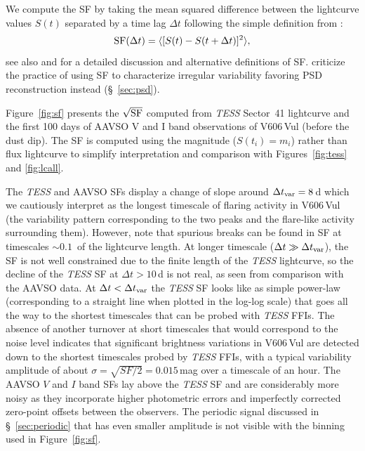 \documentclass[twocolumn]{aastex631}
\newcommand{\nova}{V606\,Vul}
\begin{document}
We compute the SF by taking the mean squared difference between the lightcurve values $S(t)$ 
separated by a time lag $\Delta t$ following the simple definition from \cite{1992ApJ...396..469H}:
\begin{equation}
{\rm SF}(\Delta t) = \langle[S(t) - S(t + \Delta t)]^2\rangle,
\label{eq:sf}
\end{equation}
see also \cite{2016ApJ...826..118K} and \cite{2014MNRAS.439..703G} for a detailed discussion and 
alternative definitions of SF. \cite{2010MNRAS.404..931E} criticize the
practice of using SF to characterize irregular variability favoring PSD
reconstruction instead (\S~\ref{sec:psd}).

Figure~\ref{fig:sf} presents the $\sqrt{{\rm SF}}$ computed from {\em TESS} Sector~41 lightcurve 
and the first 100 days of AAVSO V and I band observations of \nova{} (before the dust dip).
The SF is computed using the magnitude ($S(t_i) = m_i$) rather than flux lightcurve
to simplify interpretation and comparison with Figures~\ref{fig:tess} and \ref{fig:lcall}.

The {\em TESS} and AAVSO SFs display a change of slope around $\Delta t_{\rm var} = 8$\,d 
which we cautiously interpret as the longest timescale of flaring activity in \nova{}
(the variability pattern corresponding to the two peaks and the flare-like activity surrounding them).
However, \cite{2010MNRAS.404..931E} note that spurious breaks can be
found in SF at timescales $\sim 0.1$~of the lightcurve length.
At longer timescale ($\Delta t \gg \Delta t_{\rm var}$), 
the SF is not well constrained due to the finite length of the {\em TESS}
lightcurve, so the decline of the {\em TESS} SF at $\Delta t > 10$\,d is not
real, as seen from comparison with the AAVSO data. 
At $\Delta t < \Delta t_{\rm var}$ the {\em TESS} SF looks like as simple power-law 
(corresponding to a straight line when plotted in the log-log scale) that 
goes all the way to the shortest timescales that can be probed with {\em TESS} FFIs. 
The absence of another turnover at short timescales that would correspond to the noise
level \citep[see fig.~1 of][]{1992ApJ...396..469H} indicates that 
significant brightness variations in \nova{} are detected down to the shortest
timescales probed by {\em TESS} FFIs, with a typical variability amplitude of 
about $\sigma = \sqrt{SF/2} = 0.015$\,mag over a timescale of an hour.
The AAVSO $V$ and $I$ band SFs lay above the {\em TESS} SF and are considerably
more noisy as they incorporate higher photometric errors and imperfectly
corrected zero-point offsets between the observers.
The periodic signal discussed in \S~\ref{sec:periodic} that has even smaller
amplitude is not visible with the binning used in Figure~\ref{fig:sf}.
\end{document}
